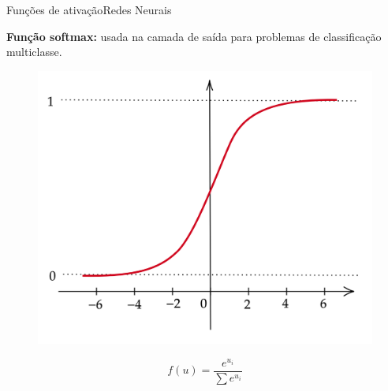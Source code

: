 \documentclass[t]{beamer}
\begin{document}
\begin{ftst}{Funções de ativação}{Redes Neurais}

\textbf{Função softmax:} usada na camada de saída para problemas de classificação multiclasse.
\begin{figure}[!htb]
    \centering
    \begin{minipage}{.5\textwidth}
        \centering
        \includegraphics[scale=0.12]{Figuras/sigmoide.png}
        \label{fig:prob1_6_2}
    \end{minipage}%
    \begin{minipage}{0.5\textwidth}
        \centering
        \begin{equation}
            f(u) = \frac{e^{u_i}}{\sum e^{u_i}}
        \end{equation}
         \left [ 0, 1]
    \end{minipage}
\end{figure}
\end{ftst}

\end{document}
